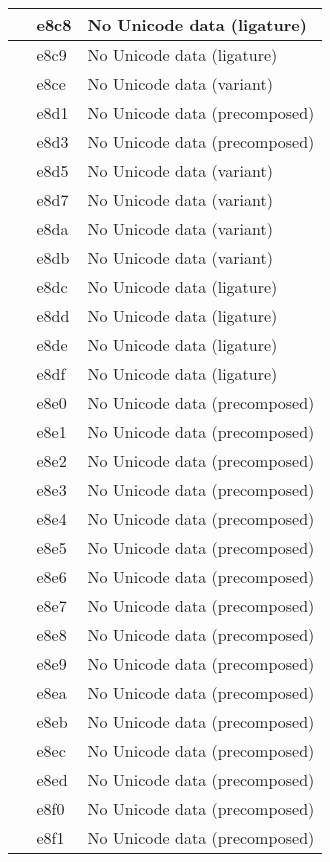 \documentclass[12pt,letterpaper,openany]{book}
\begin{document}
\begin{center}
\begin{supertabular}{|m{0.25in}|m{0.5in}|m{4in}|}
			 & e8c8 & No Unicode data (ligature)\\\hline
			 & e8c9 & No Unicode data (ligature)\\\hline
			 & e8ce & No Unicode data (variant)\\\hline
			 & e8d1 & No Unicode data (precomposed)\\\hline
			 & e8d3 & No Unicode data (precomposed)\\\hline
			 & e8d5 & No Unicode data (variant)\\\hline
			 & e8d7 & No Unicode data (variant)\\\hline
			 & e8da & No Unicode data (variant)\\\hline
			 & e8db & No Unicode data (variant)\\\hline
			 & e8dc & No Unicode data (ligature)\\\hline
			 & e8dd & No Unicode data (ligature)\\\hline
			 & e8de & No Unicode data (ligature)\\\hline
			 & e8df & No Unicode data (ligature)\\\hline
			 & e8e0 & No Unicode data (precomposed)\\\hline
			 & e8e1 & No Unicode data (precomposed)\\\hline
			 & e8e2 & No Unicode data (precomposed)\\\hline
			 & e8e3 & No Unicode data (precomposed)\\\hline
			 & e8e4 & No Unicode data (precomposed)\\\hline
			 & e8e5 & No Unicode data (precomposed)\\\hline
			 & e8e6 & No Unicode data (precomposed)\\\hline
			 & e8e7 & No Unicode data (precomposed)\\\hline
			 & e8e8 & No Unicode data (precomposed)\\\hline
			 & e8e9 & No Unicode data (precomposed)\\\hline
			 & e8ea & No Unicode data (precomposed)\\\hline
			 & e8eb & No Unicode data (precomposed)\\\hline
			 & e8ec & No Unicode data (precomposed)\\\hline
			 & e8ed & No Unicode data (precomposed)\\\hline
			 & e8f0 & No Unicode data (precomposed)\\\hline
			 & e8f1 & No Unicode data (precomposed)\\\hline

\end{supertabular}
\end{center}
\end{document}
